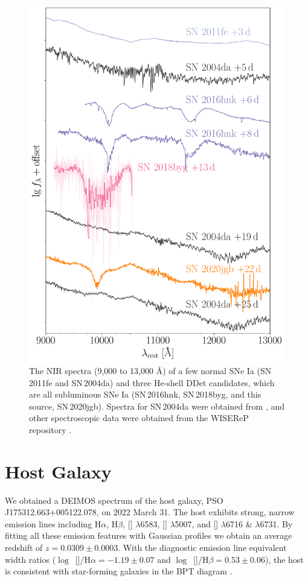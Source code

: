 \documentclass[twocolumn]{aastex631}
\newcommand{\sn}{SN\,2020jgb}
\begin{document}
\begin{figure}
    \centering
    \includegraphics[width=\linewidth]{NIR_spec_comp.pdf}
    \caption{The NIR spectra (9,000 to 13,000 \AA) of a few normal SNe Ia (SN\,2011fe and SN\,2004da) and three He-shell DDet candidates, which are all subluminous SNe Ia (SN\,2016hnk, SN\,2018byg, and this source, \sn). Spectra for SN\,2004da were obtained from \citet{Marion2009_NIR}, and other spectroscopic data were obtained from the WISEReP repository \citep{wiserep_2012}.}
    \label{fig:NIR_comp}
\end{figure}

\section{Host Galaxy} \label{sec:host}
We obtained a DEIMOS spectrum of the host galaxy, PSO J175312.663+005122.078, on 2022 March 31. The host exhibits strong, narrow emission lines including H$\alpha$, H$\beta$, [] $\lambda$6583, [] $\lambda$5007, and [] $\lambda$6716 \& $\lambda$6731. By fitting all these emission features with Gaussian profiles we obtain an average redshift of $z=0.0309\pm0.0003$. With the diagnostic emission line equivalent width ratios ($\log$~[]/H$\alpha=-1.19\pm0.07$ and $\log$~[]/H$\beta=0.53\pm0.06$), the host is consistent with star-forming galaxies in the BPT diagram \citep{BPT_1981, Veilleux_1987}.
\end{document}
